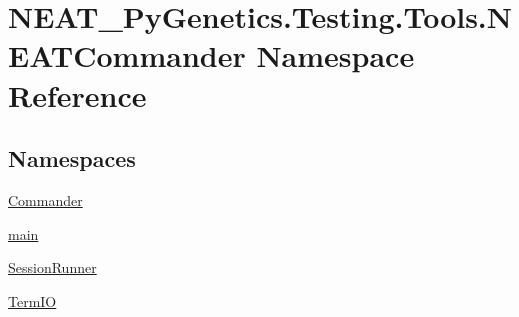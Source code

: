 \hypertarget{namespaceNEAT__PyGenetics_1_1Testing_1_1Tools_1_1NEATCommander}{}\section{N\+E\+A\+T\+\_\+\+Py\+Genetics.\+Testing.\+Tools.\+N\+E\+A\+T\+Commander Namespace Reference}
\label{namespaceNEAT__PyGenetics_1_1Testing_1_1Tools_1_1NEATCommander}
\subsection*{Namespaces}
\begin{DoxyCompactItemize}
\item 
 \hyperlink{namespaceNEAT__PyGenetics_1_1Testing_1_1Tools_1_1NEATCommander_1_1Commander}{Commander}
\item 
 \hyperlink{namespaceNEAT__PyGenetics_1_1Testing_1_1Tools_1_1NEATCommander_1_1main}{main}
\item 
 \hyperlink{namespaceNEAT__PyGenetics_1_1Testing_1_1Tools_1_1NEATCommander_1_1SessionRunner}{Session\+Runner}
\item 
 \hyperlink{namespaceNEAT__PyGenetics_1_1Testing_1_1Tools_1_1NEATCommander_1_1TermIO}{Term\+IO}
\end{DoxyCompactItemize}
